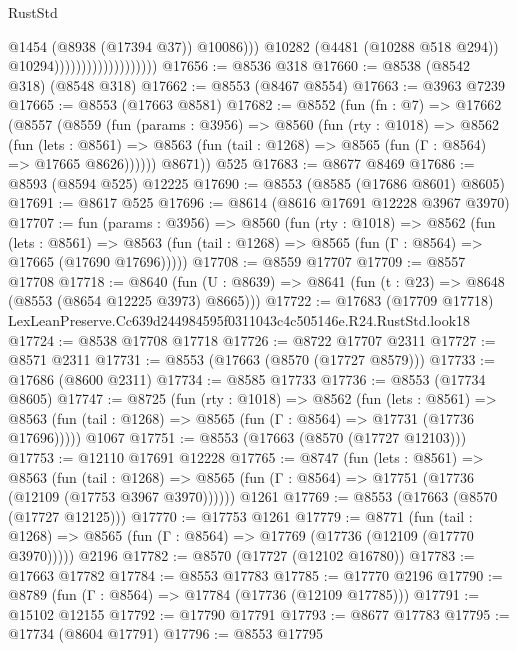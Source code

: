 \begin{lexlean}{RustStd}
\begin{coremodule}
                                                @1454
                                                (@8938 (@17394 @37))
                                                @10086)))
                                          @10282
                                          (@4481 (@10288 @518 @294))
                                          @10294)))))))))))))))))))
@17656 := @8536 @318
@17660 := @8538 (@8542 @318) (@8548 @318)
@17662 := @8553 (@8467 @8554)
@17663 := @3963 @7239
@17665 := @8553 (@17663 @8581)
@17682 := @8552
    (fun (fn : @7) =>
    @17662
      (@8557
        (@8559
          (fun (params : @3956) =>
          @8560
            (fun (rty : @1018) =>
            @8562
              (fun (lets : @8561) =>
              @8563 (fun (tail : @1268) => @8565 (fun (Γ : @8564) => @17665 @8626))))))
        @8671))
    @525
@17683 := @8677 @8469
@17686 := @8593 (@8594 @525) @12225
@17690 := @8553 (@8585 (@17686 @8601) @8605)
@17691 := @8617 @525
@17696 := @8614 (@8616 @17691 @12228 @3967 @3970)
@17707 := fun (params : @3956) =>
  @8560
    (fun (rty : @1018) =>
    @8562
      (fun (lets : @8561) =>
      @8563 (fun (tail : @1268) => @8565 (fun (Γ : @8564) => @17665 (@17690 @17696)))))
@17708 := @8559 @17707
@17709 := @8557 @17708
@17718 := @8640
    (fun (U : @8639) => @8641 (fun (t : @23) => @8648 (@8553 (@8654 @12225 @3973) @8665)))
@17722 := @17683
    (@17709 @17718)
    LexLeanPreserve.Cc639d244984595f0311043c4c505146e.R24.RustStd.look18
@17724 := @8538 @17708 @17718
@17726 := @8722 @17707 @2311
@17727 := @8571 @2311
@17731 := @8553 (@17663 (@8570 (@17727 @8579)))
@17733 := @17686 (@8600 @2311)
@17734 := @8585 @17733
@17736 := @8553 (@17734 @8605)
@17747 := @8725
    (fun (rty : @1018) =>
    @8562
      (fun (lets : @8561) =>
      @8563 (fun (tail : @1268) => @8565 (fun (Γ : @8564) => @17731 (@17736 @17696)))))
    @1067
@17751 := @8553 (@17663 (@8570 (@17727 @12103)))
@17753 := @12110 @17691 @12228
@17765 := @8747
    (fun (lets : @8561) =>
    @8563
      (fun (tail : @1268) =>
      @8565 (fun (Γ : @8564) => @17751 (@17736 (@12109 (@17753 @3967 @3970))))))
    @1261
@17769 := @8553 (@17663 (@8570 (@17727 @12125)))
@17770 := @17753 @1261
@17779 := @8771
    (fun (tail : @1268) => @8565 (fun (Γ : @8564) => @17769 (@17736 (@12109 (@17770 @3970)))))
    @2196
@17782 := @8570 (@17727 (@12102 @16780))
@17783 := @17663 @17782
@17784 := @8553 @17783
@17785 := @17770 @2196
@17790 := @8789 (fun (Γ : @8564) => @17784 (@17736 (@12109 @17785)))
@17791 := @15102 @12155
@17792 := @17790 @17791
@17793 := @8677 @17783
@17795 := @17734 (@8604 @17791)
@17796 := @8553 @17795

\end{coremodule}
\end{lexlean}
